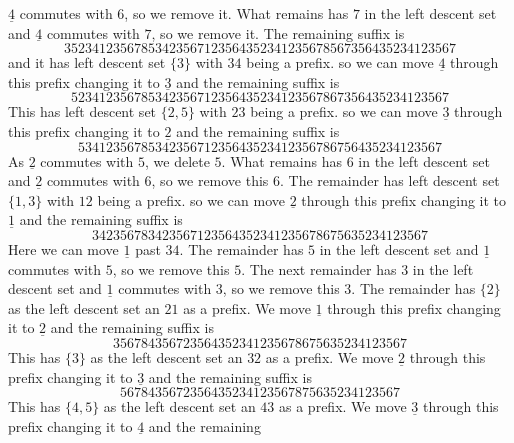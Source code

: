 \documentclass[a4paper]{amsart}
\begin{document}
$\underline{4}$ commutes with $6$, so we remove it.
What remains has $7$ in the left descent set and
$\underline{4}$ commutes with $7$, so we remove it.
The remaining suffix is
\begin{displaymath}
35234123567853423567123564352341235678567356435234123567
\end{displaymath}
and it has left descent set $\{3\}$ with $34$ being a prefix.
so we can  move $\underline{4}$ through this prefix 
changing it to $\underline{3}$ and the remaining
suffix is
\begin{displaymath}
523412356785342356712356435234123567867356435234123567
\end{displaymath}
This has left descent set $\{2,5\}$ with $23$ being a prefix.
so we can  move $\underline{3}$ through this prefix 
changing it to $\underline{2}$ and the remaining
suffix is
\begin{displaymath}
5341235678534235671235643523412356786756435234123567
\end{displaymath}
As $\underline{2}$ commutes with $5$, we delete $5$.
What remains has $6$ in the left descent set and
$\underline{2}$ commutes with $6$, so we remove this $6$.
The remainder has left descent set $\{1,3\}$ with $12$ being a prefix.
so we can  move $\underline{2}$ through this prefix 
changing it to $\underline{1}$ and the remaining
suffix is
\begin{displaymath}
342356783423567123564352341235678675635234123567
\end{displaymath}
Here we can move $\underline{1}$ past $34$. 
The remainder has $5$ in the left descent set and
$\underline{1}$ commutes with $5$, so we remove this $5$.
The next remainder has $3$ in the left descent set and
$\underline{1}$ commutes with $3$, so we remove this $3$.
The remainder has $\{2\}$ as the left descent set an
$21$ as a prefix. We move $\underline{1}$ through this prefix 
changing it to $\underline{2}$ and the remaining
suffix is
\begin{displaymath}
356784356723564352341235678675635234123567
\end{displaymath}
This has $\{3\}$ as the left descent set an
$32$ as a prefix. We move $\underline{2}$ through this prefix 
changing it to $\underline{3}$ and the remaining
suffix is
\begin{displaymath}
5678435672356435234123567875635234123567
\end{displaymath}
This has $\{4,5\}$ as the left descent set an
$43$ as a prefix. We move $\underline{3}$ through this prefix 
changing it to $\underline{4}$ and the remaining
\end{document}
